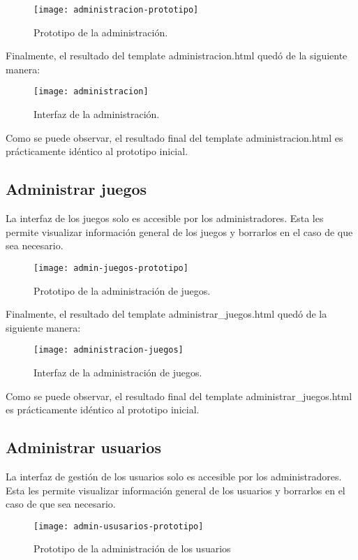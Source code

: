 \begin{figure}[htb]
\centering
\texttt{[image: administracion-prototipo]}
\caption{Prototipo de la administración.}
\label{fig:administracion-prototipo}
\end{figure}

Finalmente, el resultado del template administracion.html quedó de la siguiente manera:

\begin{figure}[htb]
\centering
\texttt{[image: administracion]}
\caption{Interfaz de la administración.}
\label{fig:administracion}
\end{figure}

Como se puede observar, el resultado final del template administracion.html es prácticamente idéntico al prototipo inicial. 

\subsection{Administrar juegos}
La interfaz de los juegos solo es accesible por los administradores. Esta les permite visualizar información general de los juegos y borrarlos en el caso de que sea necesario.

\begin{figure}[htb]
\centering
\texttt{[image: admin-juegos-prototipo]}
\caption{Prototipo de la administración de juegos.}
\label{fig:admin-juegos-prototipo}
\end{figure}

Finalmente, el resultado del template administrar\_juegos.html quedó de la siguiente manera:

\begin{figure}[htb]
\centering
\texttt{[image: administracion-juegos]}
\caption{Interfaz de la administración de juegos.}
\label{fig:administracion-juegos}
\end{figure}

Como se puede observar, el resultado final del template administrar\_juegos.html es prácticamente idéntico al prototipo inicial. 

\subsection{Administrar usuarios}
La interfaz de gestión de los usuarios solo es accesible por los administradores. Esta les permite visualizar información general de los usuarios y borrarlos en el caso de que sea necesario.
\begin{figure}[htb]
\centering
\texttt{[image: admin-ususarios-prototipo]}
\caption{Prototipo de la administración de los usuarios}
\label{fig:admin-ususarios-prototipo}
\end{figure}

